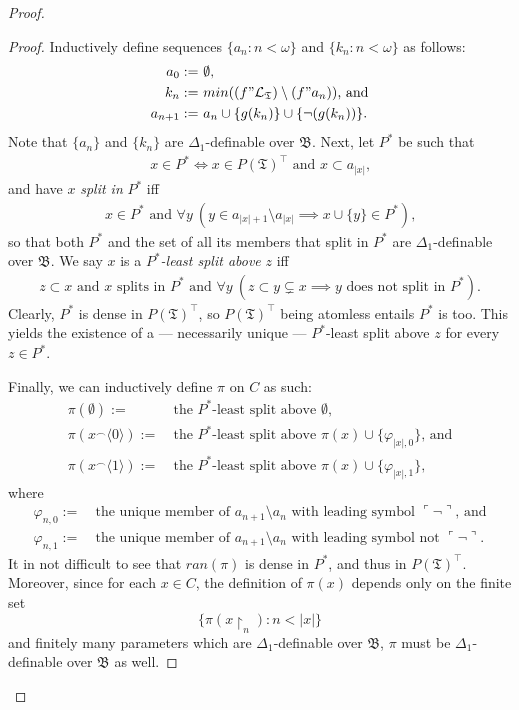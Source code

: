 \documentclass[12pt, twoside]{memoir}
\numberwithin{equation}{section}
\theoremstyle{definition}
\theoremstyle{remark}
\theoremstyle{definition}
\theoremstyle{definition}
\theoremstyle{definition}
\theoremstyle{remark}
\begin{document}
\begin{proof}
\begin{proof}
Inductively define sequences $\{a_n : n < \omega\}$ and $\{k_n : n < \omega\}$ as follows:
\begin{align*}
    a_0 := \ & \emptyset \text{,} \\
    k_n := \ & min((f" \mathcal{L}_{\mathfrak{T}}) \setminus (f" a_n)) \text{, and} \\
    a_{n + 1} := \ & a_n \cup \{g(k_n)\} \cup \{\neg(g(k_n))\} \text{.}
\end{align*}
Note that $\{a_n\}$ and $\{k_n\}$ are $\Delta_1$-definable over $\mathfrak{B}$. Next, let $P^*$ be such that
\begin{align*}
    x \in P^* \iff x \in P(\mathfrak{T})^{\top} \text{ and } x \subset a_{|x|} \text{,}
\end{align*}
and have $x$ \emph{split in} $P^*$ iff
\begin{align*}
    x \in P^* \text{ and } \forall y \ (y \in a_{|x| + 1} \setminus a_{|x|} \implies x \cup \{y\} \in P^*) \text{,}
\end{align*}
so that both $P^*$ and the set of all its members that split in $P^*$ are $\Delta_1$-definable over $\mathfrak{B}$. We say $x$ is a $P^*$\emph{-least split above} $z$ iff
\begin{align*}
    z \subset x \text{ and } x \text{ splits in } P^* \text{ and } \forall y \ (z \subset y \subsetneq x \implies y \text{ does not split in } P^*) \text{.}
\end{align*}
Clearly, $P^*$ is dense in $P(\mathfrak{T})^{\top}$, so $P(\mathfrak{T})^{\top}$ being atomless entails $P^*$ is too. This yields the existence of a --- necessarily unique --- $P^*$-least split above $z$ for every $z \in P^*$.

Finally, we can inductively define $\pi$ on $C$ as such:
\begin{align*}
    \pi(\emptyset) := \ & \text{the } P^* \text{-least split above } \emptyset \text{,} \\
    \pi(x^{\frown}\langle 0 \rangle) := \ & \text{the } P^* \text{-least split above } \pi(x) \cup \{\varphi_{|x|, 0}\} \text{, and} \\
    \pi(x^{\frown}\langle 1 \rangle) := \ & \text{the } P^* \text{-least split above } \pi(x) \cup \{\varphi_{|x|, 1}\} \text{,}
\end{align*}
where
\begin{align*}
    \varphi_{n, 0} := \ & \text{the unique member of } a_{n + 1} \setminus a_n \text{ with leading symbol } \ulcorner \neg \urcorner \text{, and} \\
    \varphi_{n, 1} := \ & \text{the unique member of } a_{n + 1} \setminus a_n \text{ with leading symbol not } \ulcorner \neg \urcorner \text{.} 
\end{align*}
It in not difficult to see that $ran(\pi)$ is dense in $P^*$, and thus in $P(\mathfrak{T})^{\top}$. Moreover, since for each $x \in C$, the definition of $\pi(x)$ depends only on the finite set $$\{\pi(x \! \restriction_n) : n < |x|\}$$ and finitely many parameters which are $\Delta_1$-definable over $\mathfrak{B}$, $\pi$ must be $\Delta_1$-definable over $\mathfrak{B}$ as well.
\end{proof}


\end{proof}
\end{document}
